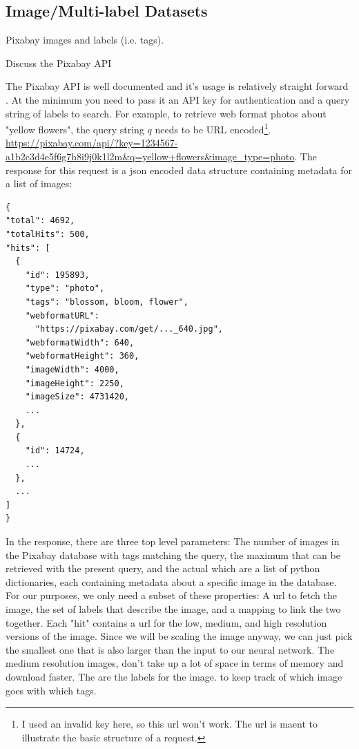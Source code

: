 \documentclass[10pt, a4paper, twocolumn]{article} %
\begin{document}
\subsection{Image/Multi-label Datasets}

Pixabay images and labels (i.e. tags).

Discuss the Pixabay API

The Pixabay API is well documented and it's usage is relatively straight forward \citep{Pixabay:API}.  At the minimum you need to pass it an API key for authentication and a query string of labels to search.  For example, to retrieve web format photos about "yellow flowers", the query string $q$ needs to be URL encoded\footnote{I used an invalid key here, so this url won't work.  The url is maent to illustrate the basic structure of a request.}. \url{https://pixabay.com/api/?key=1234567-a1b2c3d4e5f6g7h8i9j0k1l2m\&q=yellow+flowers\&image\_type=photo}. The response for this request is a json encoded data structure containing metadata for a list of images:

\begin{verbatim}
{
"total": 4692,
"totalHits": 500,
"hits": [
  {
    "id": 195893,
    "type": "photo",
    "tags": "blossom, bloom, flower",
    "webformatURL": 
      "https://pixabay.com/get/..._640.jpg",
    "webformatWidth": 640,
    "webformatHeight": 360,
    "imageWidth": 4000,
    "imageHeight": 2250,
    "imageSize": 4731420,
    ...
  },
  {
    "id": 14724,
    ...
  },
  ...
]
}
\end{verbatim}

In the response, there are three top level parameters: The  number of images in the Pixabay database with tags matching the query, the maximum  that can be retrieved with the present query, and the actual  which are a list of python dictionaries, each containing metadata about a specific image in the database.  For our purposes, we only need a subset of these properties:  A url to fetch the image, the set of labels that describe the image, and a mapping to link the two together.  Each "hit" contains a url for the low, medium, and high resolution versions of the image. Since we will be scaling the image anyway, we can just pick the smallest one that is also larger than the input to our neural network. The medium resolution images,  don't take up a lot of space in terms of memory and download faster.  The  are the labels for the image.   to keep track of which image goes with which tags. 
\end{document}
